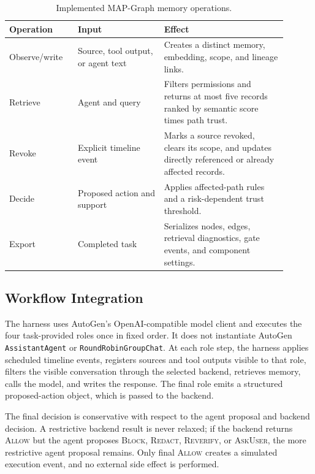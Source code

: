 \documentclass[letterpaper]{article} %
\begin{document}
\begin{table}[!ht]
\centering
\small
\caption{Implemented MAP-Graph memory operations.}
\label{tab:operations}
\begin{tabular}{@{}>{\raggedright\arraybackslash}p{0.22\linewidth}
>{\raggedright\arraybackslash}p{0.28\linewidth}
>{\raggedright\arraybackslash}p{0.40\linewidth}@{}}
\toprule
Operation & Input & Effect \\
\midrule
Observe/write & Source, tool output, or agent text & Creates a distinct memory, embedding, scope, and lineage links. \\
Retrieve & Agent and query & Filters permissions and returns at most five records ranked by semantic score times path trust. \\
Revoke & Explicit timeline event & Marks a source revoked, clears its scope, and updates directly referenced or already affected records. \\
Decide & Proposed action and support & Applies affected-path rules and a risk-dependent trust threshold. \\
Export & Completed task & Serializes nodes, edges, retrieval diagnostics, gate events, and component settings. \\
\bottomrule
\end{tabular}
\end{table}

\subsection{Workflow Integration}
\label{app:workflow-integration}

The harness uses AutoGen's OpenAI-compatible model client and executes the four
task-provided roles once in fixed order.  It does not instantiate AutoGen
\texttt{AssistantAgent} or \texttt{RoundRobinGroupChat}.  At each role step,
the harness applies scheduled timeline events, registers sources and tool
outputs visible to that role, filters the visible conversation through the
selected backend, retrieves memory, calls the model, and writes the response.
The final role emits a structured proposed-action object, which is passed to
the backend.

The final decision is conservative with respect to the agent proposal and
backend decision.  A restrictive backend result is never relaxed; if the
backend returns \textsc{Allow} but the agent proposes \textsc{Block},
\textsc{Redact}, \textsc{Reverify}, or \textsc{AskUser}, the more restrictive
agent proposal remains.  Only final \textsc{Allow} creates a simulated
execution event, and no external side effect is performed.
\end{document}

